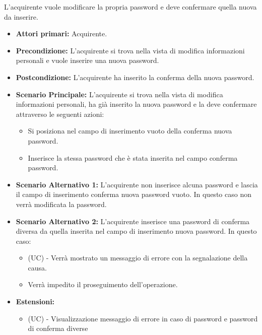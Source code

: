 L'acquirente vuole modificare la propria password e deve confermare quella nuova da inserire.
\begin{itemize}
    \item \textbf{Attori primari:} Acquirente.
    \item \textbf{Precondizione:} L'acquirente si trova nella vista di modifica informazioni personali e vuole inserire una nuova password.
    \item \textbf{Postcondizione:} L'acquirente ha inserito la conferma della nuova password.
    \item \textbf{Scenario Principale:} L'acquirente si trova nella vista di modifica informazioni personali, ha già inserito la nuova password e la deve confermare attraverso le seguenti azioni:
        \begin{itemize}
            \item Si posiziona nel campo di inserimento vuoto della conferma nuova password.
            \item Inserisce la stessa password che è stata inserita nel campo conferma password.
        \end{itemize}
    \item \textbf{Scenario Alternativo 1:} L'acquirente non inserisce alcuna password e lascia il campo di inserimento conferma nuova password vuoto. In questo caso non verrà modificata la password.
    \item \textbf{Scenario Alternativo 2:} L'acquirente inserisce una password di conferma diversa da quella inserita nel campo di inserimento nuova password. In questo caso:
    \begin{itemize}
        \item (UC) - Verrà mostrato un messaggio di errore con la segnalazione della causa.
        \item Verrà impedito il proseguimento dell'operazione.
    \end{itemize}
    \item \textbf{Estensioni:}
    \begin{itemize}
        \item (UC) - Visualizzazione messaggio di errore in caso di password e password di conferma diverse
    \end{itemize}
\end{itemize}

